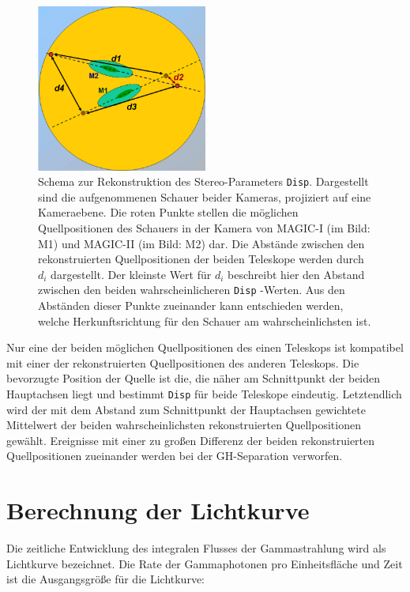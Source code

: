 \begin{figure}
    \centering
    \includegraphics[width=0.5\textwidth]{./Plots/04_MrkAnalyse/Disp.png}
    \caption{Schema zur Rekonstruktion des Stereo-Parameters \texttt{Disp}. 
    Dargestellt sind die aufgenommenen Schauer beider Kameras, projiziert auf eine Kameraebene.
    Die roten Punkte stellen die möglichen Quellpositionen des Schauers in der Kamera von MAGIC-I (im Bild: M1) und MAGIC-II (im Bild: M2) dar.
    Die Abstände zwischen den rekonstruierten Quellpositionen der beiden Teleskope werden durch $d_i$ dargestellt. 
    Der kleinste Wert für $d_i$ beschreibt hier den Abstand zwischen den beiden wahrscheinlicheren \texttt{Disp} -Werten.
    Aus den Abständen dieser Punkte zueinander kann entschieden werden, welche Herkunftsrichtung für den Schauer am wahrscheinlichsten ist.\cite{DispRekonstruktion}}
    \label{Disp}
\end{figure}

Nur eine der beiden möglichen Quellpositionen des einen Teleskops ist kompatibel mit einer der rekonstruierten Quellpositionen des anderen Teleskops. 
Die bevorzugte Position der Quelle ist die, die näher am Schnittpunkt der beiden Hauptachsen liegt und bestimmt \texttt{Disp} für beide Teleskope eindeutig.
Letztendlich wird der mit dem Abstand zum Schnittpunkt der Hauptachsen gewichtete Mittelwert der beiden wahrscheinlichsten rekonstruierten Quellpositionen gewählt.
Ereignisse mit einer zu großen Differenz der beiden rekonstruierten Quellpositionen zueinander werden bei der GH-Separation verworfen.\cite{DispRekonstruktion}


\section{Berechnung der Lichtkurve}
\label{sec:Lichtkurve}
Die zeitliche Entwicklung des integralen Flusses der Gammastrahlung wird als Lichtkurve bezeichnet.
Die Rate der Gammaphotonen pro Einheitsfläche und Zeit ist die Ausgangsgröße für die Lichtkurve:

